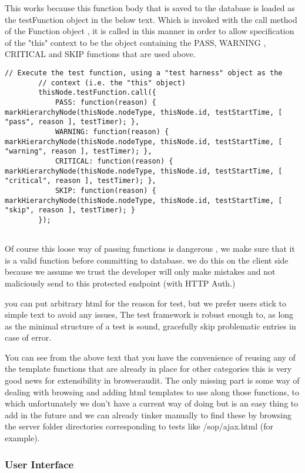 This works because this function body that is saved to the database is loaded as the testFunction object in the below text.
Which is invoked with the call method of the Function object , it is called in this manner in order to allow specification
of the "this" context to be the object containing the PASS, WARNING , CRITICAL and SKIP functions that are used above. 

\begin{verbatim}
// Execute the test function, using a "test harness" object as the
		// context (i.e. the "this" object)
		thisNode.testFunction.call({
			PASS: function(reason) { markHierarchyNode(thisNode.nodeType, thisNode.id, testStartTime, [ "pass", reason ], testTimer); },
			WARNING: function(reason) { markHierarchyNode(thisNode.nodeType, thisNode.id, testStartTime, [ "warning", reason ], testTimer); },
			CRITICAL: function(reason) { markHierarchyNode(thisNode.nodeType, thisNode.id, testStartTime, [ "critical", reason ], testTimer); },
			SKIP: function(reason) { markHierarchyNode(thisNode.nodeType, thisNode.id, testStartTime, [ "skip", reason ], testTimer); }
		});
	      
\end{verbatim}

Of course this loose way of passing functions is dangerous , we make sure that it is a valid function before  committing to database.
we do this on the client side because we assume we trust the developer will only make mistakes and not maliciously send to this 
protected endpoint (with HTTP Auth.)

you can put arbitrary html for the reason for test, but we prefer users stick to simple text to avoid any issues, 
The test framework is robust enough to, as long as the minimal structure of a test is sound, gracefully skip problematic entries in case of error.

You can see from the above text that you have the convenience of reusing any of the template functions that are already in place for other categories
this is very good news for extensibility in browseraudit. The only missing part is some way of dealing with browsing and adding html templates
to use along those functions, to which unfortunately we don't have a current way of doing but is an easy thing to add in the future and we
can already tinker manually to find these by browsing the server folder directories corresponding to tests like /sop/ajax.html (for example).

\subsubsection{User Interface}

